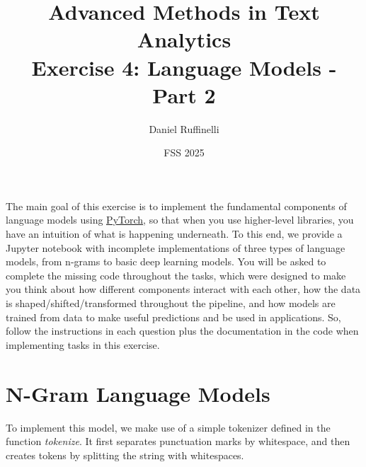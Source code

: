 \documentclass[11pt,a4paper]{article}
\title{Advanced Methods in Text Analytics \\ 
Exercise 4: Language Models - Part 2}
\author{Daniel Ruffinelli}
\date{FSS 2025}
\begin{document}
\maketitle

The main goal of this exercise is to implement the fundamental components of
language models using \href{https://pytorch.org/}{\underline{PyTorch}}, so that
when you use higher-level libraries, you have an intuition of what is happening
underneath.
To this end, we provide a Jupyter notebook with incomplete implementations of
three types of language models, from n-grams to basic deep learning models.
You will be asked to complete the missing code throughout the tasks, which were
designed to make you think about how different components interact with each
other, how the data is shaped/shifted/transformed throughout the pipeline, and
how models are trained from data to make useful predictions and be used in
applications.
So, follow the instructions in each question plus the documentation in the code
when implementing tasks in this exercise.

\section{N-Gram Language Models}

To implement this model, we make use of a simple tokenizer defined in the
function \emph{tokenize}.
It first separates punctuation marks by whitespace, and then creates tokens by
splitting the string with whitespaces.
\end{document}
